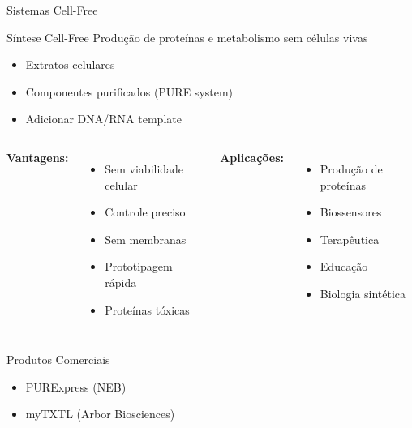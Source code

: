 \begin{frame}{Sistemas Cell-Free}
\begin{block}{Síntese Cell-Free}
Produção de proteínas e metabolismo sem células vivas
\begin{itemize}
    \item Extratos celulares
    \item Componentes purificados (PURE system)
    \item Adicionar DNA/RNA template
\end{itemize}
\end{block}

\vspace{0.3cm}

\begin{columns}
\textbf{Vantagens:}
\begin{itemize}
    \item Sem viabilidade celular
    \item Controle preciso
    \item Sem membranas
    \item Prototipagem rápida
    \item Proteínas tóxicas
\end{itemize}

\textbf{Aplicações:}
\begin{itemize}
    \item Produção de proteínas
    \item Biossensores
    \item Terapêutica
    \item Educação
    \item Biologia sintética
\end{itemize}
\end{columns}

\vspace{0.3cm}

\begin{exampleblock}{Produtos Comerciais}
\begin{itemize}
    \item PURExpress (NEB)
    \item myTXTL (Arbor Biosciences)
\end{itemize}
\end{exampleblock}
\end{frame}

